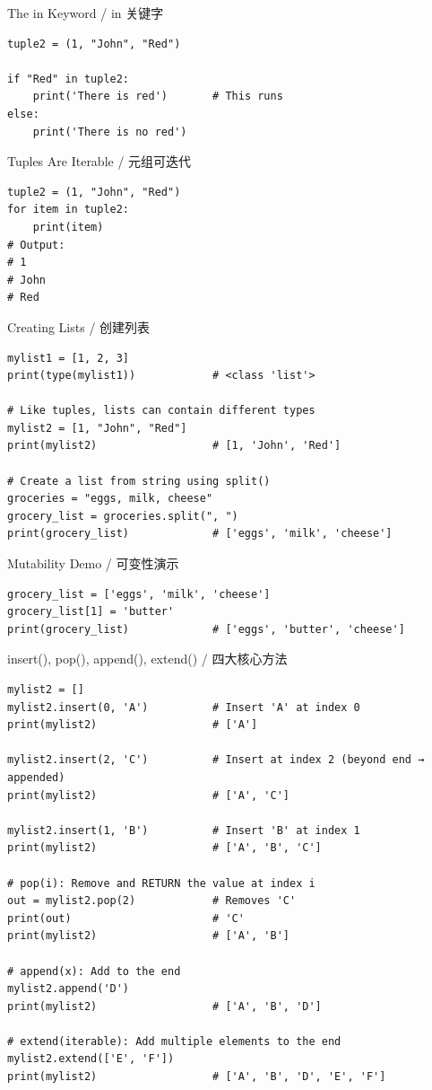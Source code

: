 \documentclass[11pt,a4paper]{report}
\begin{document}
\begin{examplebox}{The in Keyword / in 关键字}
\begin{lstlisting}
tuple2 = (1, "John", "Red")

if "Red" in tuple2:
    print('There is red')       # This runs
else:
    print('There is no red')
\end{lstlisting}
\end{examplebox}

\begin{examplebox}{Tuples Are Iterable / 元组可迭代}
\begin{lstlisting}
tuple2 = (1, "John", "Red")
for item in tuple2:
    print(item)
# Output:
# 1
# John
# Red
\end{lstlisting}
\end{examplebox}

\begin{examplebox}{Creating Lists / 创建列表}
\begin{lstlisting}
mylist1 = [1, 2, 3]
print(type(mylist1))            # <class 'list'>

# Like tuples, lists can contain different types
mylist2 = [1, "John", "Red"]
print(mylist2)                  # [1, 'John', 'Red']

# Create a list from string using split()
groceries = "eggs, milk, cheese"
grocery_list = groceries.split(", ")
print(grocery_list)             # ['eggs', 'milk', 'cheese']
\end{lstlisting}
\end{examplebox}

\begin{examplebox}{Mutability Demo / 可变性演示}
\begin{lstlisting}
grocery_list = ['eggs', 'milk', 'cheese']
grocery_list[1] = 'butter'
print(grocery_list)             # ['eggs', 'butter', 'cheese']
\end{lstlisting}
\end{examplebox}

\begin{examplebox}{insert(), pop(), append(), extend() / 四大核心方法}
\begin{lstlisting}
mylist2 = []
mylist2.insert(0, 'A')          # Insert 'A' at index 0
print(mylist2)                  # ['A']

mylist2.insert(2, 'C')          # Insert at index 2 (beyond end → appended)
print(mylist2)                  # ['A', 'C']

mylist2.insert(1, 'B')          # Insert 'B' at index 1
print(mylist2)                  # ['A', 'B', 'C']

# pop(i): Remove and RETURN the value at index i
out = mylist2.pop(2)            # Removes 'C'
print(out)                      # 'C'
print(mylist2)                  # ['A', 'B']

# append(x): Add to the end
mylist2.append('D')
print(mylist2)                  # ['A', 'B', 'D']

# extend(iterable): Add multiple elements to the end
mylist2.extend(['E', 'F'])
print(mylist2)                  # ['A', 'B', 'D', 'E', 'F']
\end{lstlisting}
\end{examplebox}
\end{document}
